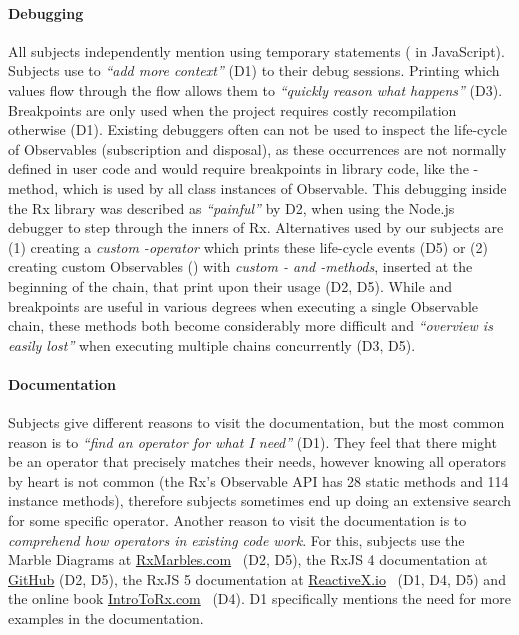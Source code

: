 \paragraph{Debugging} All subjects independently mention using temporary
\printfdebugging{} statements ( in JavaScript).
Subjects use \printfdebugging{} to \emph{``add more context''} (D1) to
their debug sessions.  Printing which values flow through the flow
allows them to \emph{``quickly reason what happens''} (D3).  Breakpoints
are only used when the project requires costly recompilation otherwise (D1).
Existing debuggers often can not be used to inspect the life-cycle of
Observables (subscription and disposal), as these occurrences are not
normally defined in user code and would require breakpoints in library
code, like the -method, which is used by all class
instances of Observable.  This debugging inside the Rx library was
described as \emph{``painful''} by D2, when using the Node.js debugger
to step through the inners of Rx.  Alternatives used by our subjects are
(1) creating a \emph{custom -operator} which prints these
life-cycle events (D5) or (2) creating custom Observables ()
with \emph{custom - and -methods}, inserted at the
beginning of the chain, that print upon their usage (D2, D5).  While
\printfdebugging{} and breakpoints are useful in various degrees when
executing a single Observable chain, these methods both become
considerably more difficult and \emph{``overview is easily lost''} when
executing multiple chains concurrently (D3, D5).

\paragraph{Documentation} Subjects give different reasons to visit the
documentation, but the most common reason is to \emph{``find an operator
for what I need''} (D1).  They feel that there might be an operator that
precisely matches their needs, however knowing all operators by heart is
not common (the Rx's Observable API has 28 static methods and 114
instance methods), therefore subjects sometimes end up doing an
extensive search for some specific operator.  Another reason to visit
the documentation is to \emph{comprehend how operators in existing code
work}.  For this, subjects use the Marble Diagrams at \href{http://rxmarbles.com}
{RxMarbles.com}~\cite{rxmarbles} (D2, D5), the RxJS 4 documentation at
\href{https://github.com/Reactive-Extensions/RxJS/blob/master/doc/} {GitHub}
(D2, D5), the RxJS 5 documentation at \href{http://reactivex.io/rxjs} {ReactiveX.io}~\cite
{reactivex} (D1, D4, D5) and the online book \href{http://introtorx.com}
{IntroToRx.com}~\cite{introtorx} (D4).  D1 specifically mentions the
need for more examples in the documentation.

